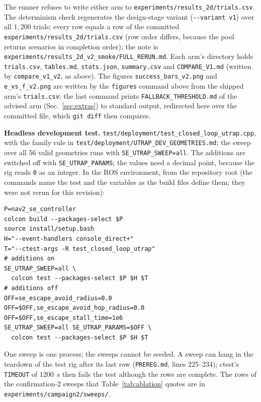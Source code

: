 \documentclass[journal]{IEEEtran}
\begin{document}
The runner refuses to write either arm to \texttt{experiments/results\_2d/trials.csv}. The
determinism check regenerates the design-stage variant (\texttt{-{}-variant v1}) over all
$1{,}200$ trials; every row equals a row of the committed \texttt{experiments/results\_2d/trials.csv}
(row order differs, because the pool returns scenarios in completion order); the note is
\texttt{experiments/results\_2d\_v2\_smoke/}\allowbreak\texttt{FULL\_RERUN.md}. Each arm's directory holds
\texttt{trials.csv}, \texttt{tables.md}, \texttt{stats.json}, \texttt{summary.csv} and
\texttt{COMPARE\_V1.md} (written by \texttt{compare\_v1\_v2}, as above). The figures
\texttt{success\_bars\_v2.png} and \texttt{e\_vs\_f\_v2.png} are written by the \texttt{figures}
command above from the shipped arm's \texttt{trials.csv}; the last command prints
\texttt{FALLBACK\_THRESHOLD.md} of the advised arm (Sec.~\ref{sec:extras}) to standard output,
redirected here over the committed file, which \texttt{git diff} then compares.

\textbf{Headless development test.} \texttt{test/deployment/}\allowbreak\texttt{test\_closed\_loop\_utrap.cpp},
with the family rule in \texttt{test/deployment/}\allowbreak\texttt{UTRAP\_DEV\_GEOMETRIES.md}; the sweep over all
56 valid geometries runs with \texttt{SE\_UTRAP\_SWEEP=all}. The additions are switched off with
\texttt{SE\_UTRAP\_PARAMS}; the values need a decimal point, because the rig reads \texttt{0} as an
integer. In the ROS environment, from the repository root (the commands name the test and the
variables as the build files define them; they were not rerun for this revision):

{\scriptsize
\begin{verbatim}
P=nav2_se_controller
colcon build --packages-select $P
source install/setup.bash
H="--event-handlers console_direct+"
T="--ctest-args -R test_closed_loop_utrap"
# additions on
SE_UTRAP_SWEEP=all \
  colcon test --packages-select $P $H $T
# additions off
OFF=se_escape_avoid_radius=0.0
OFF=$OFF,se_escape_avoid_hop_radius=0.0
OFF=$OFF,se_escape_stall_time=1e6
SE_UTRAP_SWEEP=all SE_UTRAP_PARAMS=$OFF \
  colcon test --packages-select $P $H $T
\end{verbatim}
}

\noindent One sweep is one process; the sweeps cannot be seeded. A sweep can hang in the
teardown of the test rig after its last row (\texttt{PREREG.md}, lines 225--234); ctest's
\texttt{TIMEOUT} of $1200$~s then fails the test although the rows are complete. The rows of the confirmation-2
sweeps that Table~\ref{tab:ablation} quotes are in \texttt{experiments/campaign2/sweeps/}.
\end{document}
